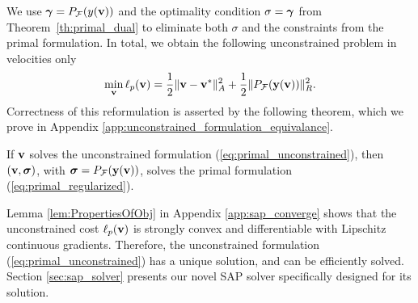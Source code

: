 We use ${\bm\gamma} = P_{\mathcal{F}}(y({\mathbf{v}}))$  and the optimality
condition $\sigma = {\bm\gamma}$ from Theorem~\ref{th:primal_dual} to eliminate both $\sigma$ and the constraints from the primal
formulation. In total, we obtain the following unconstrained problem
in velocities only
\begin{eqnarray}
	\min_{\mf{v}} \ell_p(\mf{v}) = \frac{1}{2}\Vert\mf{v}-\mf{v}^*\Vert_{A}^2 +
	\frac{1}{2}\Vert P_\mathcal{F}(\mf{y}(\mf{v}))\Vert_R^2.
	\label{eq:primal_unconstrained}
\end{eqnarray}
Correctness of this reformulation is asserted by the following theorem, 
which we prove in Appendix \ref{app:unconstrained_formulation_equivalance}.
\begin{theorem}
  If  ${\mathbf{v}}$ solves the unconstrained formulation (\ref{eq:primal_unconstrained}),
    then $({\mathbf{v}}, {\bm\sigma})$,
    with ${\bm\sigma} =P_\mathcal{F}({\mathbf{y}}({\mathbf{v}}))$,
    solves the primal
    formulation (\ref{eq:primal_regularized}).
    \label{th:unconstrained_formulation_equivalance}
\end{theorem}
Lemma \ref{lem:PropertiesOfObj} in Appendix \ref{app:sap_converge}
shows that the unconstrained cost $\ell_p({\mathbf{v}})$ is strongly convex and
differentiable with Lipschitz continuous gradients. Therefore, the unconstrained
formulation (\ref{eq:primal_unconstrained}) has a unique solution, and can be
efficiently solved.  
Section \ref{sec:sap_solver} presents our novel SAP solver specifically designed
for its solution.
